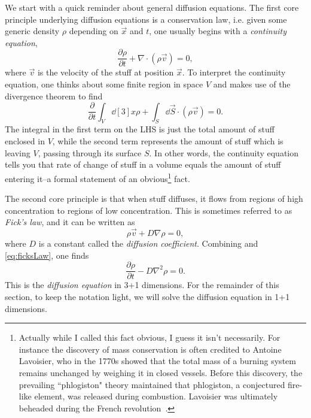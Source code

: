 We start with a quick reminder about general diffusion equations.
The first core
principle underlying diffusion equations is a conservation law, i.e.
given some generic density $\rho$ depending on $\vec{x}$ and $t$,
one usually begins with a {\it continuity equation},
\begin{equation}\label{eq:continuityEquation}
  \frac{\partial\rho}{\partial t}+\nabla\cdot\left(\rho\vec{v}\right)=0,
\end{equation}
where $\vec{v}$ is the velocity of the stuff at position $\vec{x}$. 
To interpret the continuity equation, one thinks about some finite region
in space $V$ and makes use of the divergence theorem to find
\begin{equation}
  \frac{\partial}{\partial t}\int_V \dd[3]{x}\rho
     +\int_{S}\dd{\vec{S}}\cdot\left(\rho\vec{v}\right)=0.
\end{equation}
The integral in the first term on the LHS is just the total amount of
stuff enclosed in $V$, while the second term represents the amount of
stuff which is leaving $V$, passing through its surface $S$. In other
words, the continuity equation tells you that rate of change of stuff
in a volume equals the amount of stuff entering it--a formal statement
of an obvious\footnote{Actually while I called this fact obvious,
I guess it isn't necessarily. For instance the discovery of mass conservation
is often credited to Antoine Lavoisier, who in the 1770s showed that 
the total mass of a burning system remains unchanged by weighing it
in closed vessels. Before this discovery, the prevailing ``phlogiston"
theory maintained that phlogiston, a conjectured fire-like element,
was released during combustion. Lavoisier was ultimately beheaded
during the French revolution~\cite{wiki:phlogiston,wiki:laviosier}.} fact. 

The second core principle is that when stuff diffuses, it flows from regions
of high concentration to regions of low concentration. This is
sometimes referred to as {\it Fick's law}, and it
can be written as
\begin{equation}\label{eq:ficksLaw}
  \rho\vec{v}+D\nabla\rho=0,
\end{equation}
where $D$ is a constant called the {\it diffusion coefficient}. Combining
 and \eqref{eq:ficksLaw}, one finds
\begin{equation}
  \frac{\partial\rho}{\partial t}-D\nabla^2\rho = 0.
\end{equation}
This is the {\it diffusion equation} in 3+1 dimensions. For the remainder
of this section, to keep the notation light, we will solve the diffusion
equation in 1+1 dimensions.

